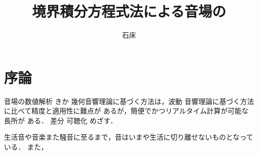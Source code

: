 \documentclass[dvipdfmx]{ampbt}
\title{境界積分方程式法による音場の}     %
      {数値解析と移動する受音点における}      %
      {リアルタイム可聴化について}                %
\author{石床}{竜一}             %
\begin{document}
\ifoutputbody
\makeinsidecover                %
\makeabstract                   %
\maketoc                        %
\setcounter{page}{1}            %
\section{序論}
音場の数値解析
きか
幾何音響理論に基づく方法は，波動
音響理論に基づく方法に比べて精度と適用性に難点が
あるが，簡便でかつリアルタイム計算が可能な長所が
ある．
差分
可聴化
めざす．

生活音や音楽また騒音に至るまで，音はいまや生活に切り離せないものとなっている．
また，



%
\end{document}
